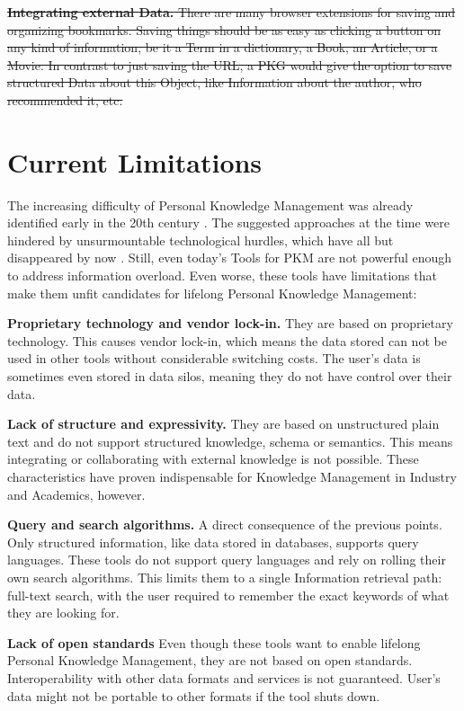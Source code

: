 \sout{\textbf{Integrating external Data.} There are many browser extensions for saving and organizing bookmarks. Saving things should be as easy as clicking a button on any kind of information, be it a Term in a dictionary, a Book, an Article, or a Movie. In contrast to just saving the URL, a PKG would give the option to save structured Data about this Object, like Information about the author, who recommended it, etc.}

\section{Current Limitations}
The increasing difficulty of Personal Knowledge Management was already identified early in the 20th century \cite{Bush1945Memex, Engelbart1962AHI}. The suggested approaches at the time were hindered by unsurmountable technological hurdles, which have all but disappeared by now \cite{Davies2005Memex60}. Still, even today's Tools for PKM are not powerful enough to address information overload. Even worse, these tools have limitations that make them unfit candidates for lifelong Personal Knowledge Management:

    \textbf{Proprietary technology and vendor lock-in.} They are based on proprietary technology. This causes vendor lock-in, which means the data stored can not be used in other tools without considerable switching costs. The user's data is sometimes even stored in data silos, meaning they do not have control over their data.

    \textbf{Lack of structure and expressivity.} They are based on unstructured plain text and do not support structured knowledge, schema or semantics. This means integrating or collaborating with external knowledge is not possible. These characteristics have proven indispensable for Knowledge Management in Industry and Academics, however. 
    
    \textbf{Query and search algorithms.} A direct consequence of the previous points. Only structured information, like data stored in databases, supports query languages. These tools do not support query languages and rely on rolling their own search algorithms. This limits them to a single Information retrieval path: full-text search, with the user required to remember the exact keywords of what they are looking for.
    
    \textbf{Lack of open standards} Even though these tools want to enable lifelong Personal Knowledge Management, they are not based on open standards. Interoperability with other data formats and services is not guaranteed. User's data might not be portable to other formats if the tool shuts down.

